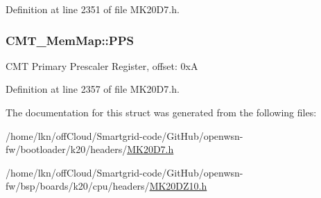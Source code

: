 Definition at line 2351 of file M\+K20\+D7.\+h.

\subsubsection[{\texorpdfstring{P\+PS}{PPS}}]{ C\+M\+T\+\_\+\+Mem\+Map\+::\+P\+PS}\hypertarget{struct_c_m_t___mem_map_a3a70b1ee9e4f0c56e0b2f48e059e1590}{}\label{struct_c_m_t___mem_map_a3a70b1ee9e4f0c56e0b2f48e059e1590}
C\+MT Primary Prescaler Register, offset\+: 0xA 

Definition at line 2357 of file M\+K20\+D7.\+h.



The documentation for this struct was generated from the following files\+:\begin{DoxyCompactItemize}
\item 
/home/lkn/off\+Cloud/\+Smartgrid-\/code/\+Git\+Hub/openwsn-\/fw/bootloader/k20/headers/\hyperlink{bootloader_2k20_2headers_2_m_k20_d7_8h}{M\+K20\+D7.\+h}\item 
/home/lkn/off\+Cloud/\+Smartgrid-\/code/\+Git\+Hub/openwsn-\/fw/bsp/boards/k20/cpu/headers/\hyperlink{_m_k20_d_z10_8h}{M\+K20\+D\+Z10.\+h}\end{DoxyCompactItemize}
